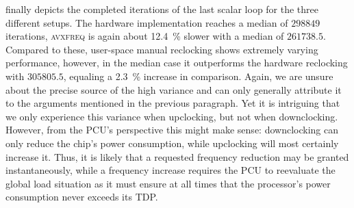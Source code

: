  finally depicts the completed iterations of the last scalar loop for the three different setups. The hardware implementation reaches a median of $298849$ iterations, \textsc{avxfreq} is again about \SI{12.4}{\percent} slower with a median of $261738.5$. Compared to these, user-space manual reclocking shows extremely varying performance, however, in the median case it outperforms the hardware reclocking with $305805.5$, equaling a \SI{2.3}{\percent} increase in comparison. Again, we are unsure about the precise source of the high variance and can only generally attribute it to the arguments mentioned in the previous paragraph. Yet it is intriguing that we only experience this variance when upclocking, but not when downclocking. However, from the \gls{PCU}'s perspective this might make sense: downclocking can only reduce the chip's power consumption, while upclocking will most certainly increase it. Thus, it is likely that a requested frequency reduction may be granted instantaneously, while a frequency increase requires the \gls{PCU} to reevaluate the global load situation as it must ensure at all times that the processor's power consumption never exceeds its \gls{TDP}.